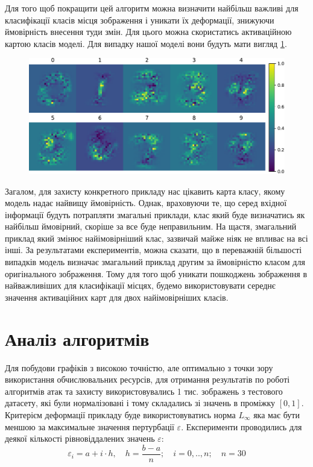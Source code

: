 \documentclass[a4paper,14pt]{extreport}
\begin{document}
	Для того щоб покращити цей алгоритм можна визначити найбільш важливі для класифікації класів місця зображення і уникати їх деформації, знижуючи ймовірність внесення туди змін. Для цього можна скористатись активаційною картою класів моделі. Для випадку нашої моделі вони будуть мати вигляд \ref{fig:classactivationmap}.
	\begin{figure}[h]
		\centering
		\includegraphics[width=\textwidth]{resources/classactivationmap.pdf}
		\caption{}
		\label{fig:classactivationmap}
	\end{figure}

	Загалом, для захисту конкретного прикладу нас цікавить карта класу, якому модель надає найвищу ймовірність. Однак, враховуючи те, що серед вхідної інформації будуть потрапляти змагальні приклади, клас який буде визначатись як найбільш ймовірний, скоріше за все буде неправильним. На щастя, змагальний приклад який змінює найімовірніший клас, зазвичай майже ніяк не впливає на всі інші. За результатами експериментів, можна сказати, що в переважній більшості випадків модель визначає змагальний приклад другим за ймовірністю класом для оригінального зображення. Тому для того щоб уникати пошкоджень зображення в найважливіших для класифікації місцях, будемо використовувати середнє значення активаційних карт для двох найімовірніших класів.
	

	\chapter{Аналіз алгоритмів}
	Для побудови графіків з високою точністю, але оптимально з точки зору використання обчислювальних ресурсів, для отримання результатів по роботі алгоритмів атак та захисту використовувались 1 тис. зображень з тестового датасету, які були нормалізовані і тому складались зі значень в проміжку $[0, 1]$. Критерієм деформації прикладу буде використовуватись норма $L_{\infty}$ яка має бути меншою за максимальне значення пертурбації $\varepsilon$. Експерименти проводились для деякої кількості рівновіддалених значень $\varepsilon$:
	$$\varepsilon_{i}=a + i \cdot h, \quad h=\frac{b - a}{n}; \quad i=0,..,n; \quad n=30$$
\end{document}
